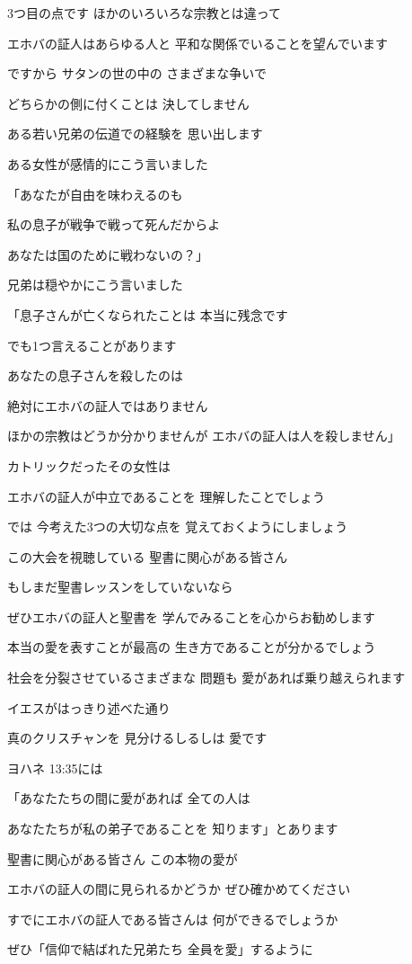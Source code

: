 \documentclass[twocolumn]{jsarticle}
\begin{document}
3つ目の点です
ほかのいろいろな宗教とは違って

エホバの証人はあらゆる人と
平和な関係でいることを望んでいます

ですから サタンの世の中の
さまざまな争いで

どちらかの側に付くことは
決してしません

ある若い兄弟の伝道での経験を
思い出します

ある女性が感情的にこう言いました

「あなたが自由を味わえるのも

私の息子が戦争で戦って死んだからよ

あなたは国のために戦わないの？」

兄弟は穏やかにこう言いました

「息子さんが亡くなられたことは
本当に残念です

でも1つ言えることがあります

あなたの息子さんを殺したのは

絶対にエホバの証人ではありません

ほかの宗教はどうか分かりませんが
エホバの証人は人を殺しません」

カトリックだったその女性は

エホバの証人が中立であることを
理解したことでしょう

では 今考えた3つの大切な点を
覚えておくようにしましょう

この大会を視聴している
聖書に関心がある皆さん

もしまだ聖書レッスンをしていないなら

ぜひエホバの証人と聖書を
学んでみることを心からお勧めします

本当の愛を表すことが最高の
生き方であることが分かるでしょう

社会を分裂させているさまざまな
問題も 愛があれば乗り越えられます

イエスがはっきり述べた通り

真のクリスチャンを
見分けるしるしは 愛です

ヨハネ 13:35には

「あなたたちの間に愛があれば
全ての人は

あなたたちが私の弟子であることを
知ります」とあります

聖書に関心がある皆さん
この本物の愛が

エホバの証人の間に見られるかどうか
ぜひ確かめてください

すでにエホバの証人である皆さんは
何ができるでしょうか

ぜひ「信仰で結ばれた兄弟たち
全員を愛」するように
\end{document}
